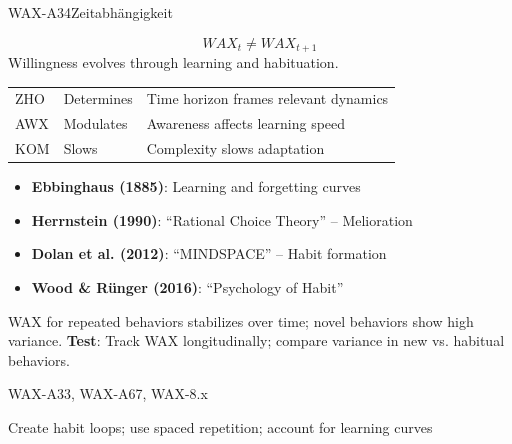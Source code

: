 \begin{axiomspec}{WAX-A34}{Zeitabhängigkeit}

\begin{equation}
WAX_t \neq WAX_{t+1}
\end{equation}
Willingness evolves through learning and habituation.

\begin{tabular}{lll}
ZHO & Determines & Time horizon frames relevant dynamics \\
AWX & Modulates & Awareness affects learning speed \\
KOM & Slows & Complexity slows adaptation \\
\end{tabular}

\begin{itemize}
\item \textbf{Ebbinghaus (1885)}: Learning and forgetting curves
\item \textbf{Herrnstein (1990)}: ``Rational Choice Theory'' -- Melioration
\item \textbf{Dolan et al. (2012)}: ``MINDSPACE'' -- Habit formation
\item \textbf{Wood \& Rünger (2016)}: ``Psychology of Habit''
\end{itemize}

WAX for repeated behaviors stabilizes over time; novel behaviors show high variance.
\textbf{Test}: Track WAX longitudinally; compare variance in new vs. habitual behaviors.

WAX-A33, WAX-A67, WAX-8.x

Create habit loops; use spaced repetition; account for learning curves

\end{axiomspec}


